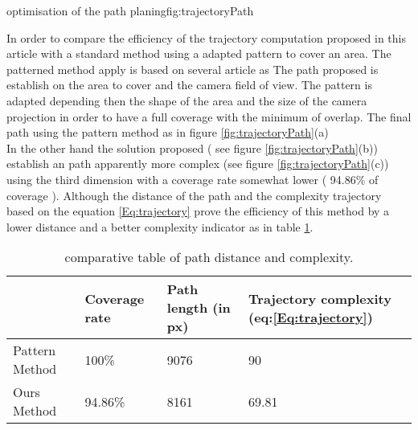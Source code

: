  \begin{mfigures}[!]{optimisation of the path planing}{fig:trajectoryPath} \centering
{}
\hspace{1cm}
\end{mfigures} 
  In order to compare the efficiency of the trajectory computation proposed in this article with a standard method using a adapted pattern to cover an area. The patterned method apply is based on several article as \cite{63*,66*,pattern155*}
 The path proposed is establish on the area to cover and the camera field of view. The pattern is adapted depending then the shape of the area and the size of the camera projection in order to have a full coverage with the minimum of overlap. The final path using the pattern method as in figure \ref{fig:trajectoryPath}(a)
 \\In the other hand the solution proposed ( see figure \ref{fig:trajectoryPath}(b)) establish an path apparently more complex (see figure \ref{fig:trajectoryPath}(c)) using the third dimension with a coverage rate somewhat lower ( 94.86\% of coverage ).
 Although  the distance of the path  and the complexity trajectory based on  the equation \ref{Eq:trajectory} prove the efficiency of this method by a lower distance and a better complexity indicator as in table \ref{table:trajectory}.\\ 
 \begin{table}[t]
\begin{tabular}{|p{1.5cm}|p{1.8cm}|p{1.8cm}|p{1.8cm}|}
  \hline
   &Coverage rate & Path length (in px) &Trajectory complexity (eq:\ref{Eq:trajectory})  \\  \hline
  Pattern Method &  100\% & 9076 &90 \\ \hline
  Ours Method &  94.86\% & 8161 &69.81 \\ \hline
\end{tabular}
\caption{comparative table  of path distance and complexity.}\label{table:trajectory}
\end{table}
 
